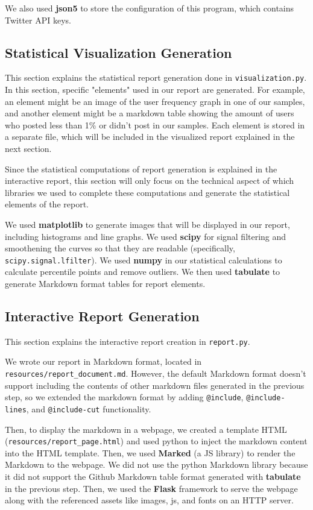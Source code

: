 \documentclass{article}
\begin{document}
    We also used \textbf{json5} to store the configuration of this program, which contains Twitter API keys.

    \subsection*{Statistical Visualization Generation}
    \indent

    This section explains the statistical report generation done in \verb|visualization.py|. In this section, specific "elements" used in our report are generated. For example, an element might be an image of the user frequency graph in one of our samples, and another element might be a markdown table showing the amount of users who posted less than 1\% or didn't post in our samples. Each element is stored in a separate file, which will be included in the visualized report explained in the next section.

    Since the statistical computations of report generation is explained in the interactive report, this section will only focus on the technical aspect of which libraries we used to complete these computations and generate the statistical elements of the report.

    We used \textbf{matplotlib} to generate images that will be displayed in our report, including histograms and line graphs. We used \textbf{scipy} for signal filtering and smoothening the curves so that they are readable (specifically, \verb|scipy.signal.lfilter|). We used \textbf{numpy} in our statistical calculations to calculate percentile points and remove outliers. We then used \textbf{tabulate} to generate Markdown format tables for report elements.

    \subsection*{Interactive Report Generation}
    \indent

    This section explains the interactive report creation in \verb|report.py|.

    We wrote our report in Markdown format, located in \verb|resources/report_document.md|. However, the default Markdown format doesn't support including the contents of other markdown files generated in the previous step, so we extended the markdown format by adding \verb|@include|, \verb|@include-lines|, and \verb|@include-cut| functionality.

    Then, to display the markdown in a webpage, we created a template HTML (\verb|resources/report_page.html|) and used python to inject the markdown content into the HTML template. Then, we used \textbf{Marked} (a JS library) to render the Markdown to the webpage. We did not use the python Markdown library because it did not support the Github Markdown table format generated with \textbf{tabulate} in the previous step. Then, we used the \textbf{Flask} framework to serve the webpage along with the referenced assets like images, js, and fonts on an HTTP server.
\end{document}
